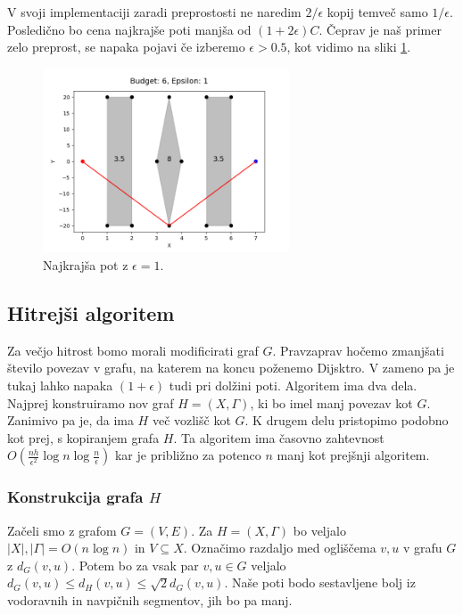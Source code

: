 \documentclass{article}
\begin{document}
V svoji implementaciji zaradi preprostosti ne naredim $2/\epsilon$ kopij temveč samo $1/\epsilon$. Posledično bo cena najkrajše poti manjša od $(1 + 2\epsilon)C$. Čeprav je naš primer zelo preprost, se napaka pojavi če izberemo $\epsilon > 0.5$, kot vidimo na sliki \ref{fig:errP05}.

\begin{figure}[ht]
    \centering
    \includegraphics[width=0.65\textwidth]{errPathEps1.png}
    \caption{Najkrajša pot z $\epsilon = 1$.}
    \label{fig:errP05}
\end{figure}




\subsection*{Hitrejši algoritem}

Za večjo hitrost bomo morali modificirati graf $G$. Pravzaprav hočemo zmanjšati število povezav v grafu, na katerem na koncu poženemo Dijsktro. V zameno pa je tukaj lahko napaka $(1+\epsilon)$ tudi pri dolžini poti. Algoritem ima dva dela. Najprej konstruiramo nov graf $H = (X,\Gamma)$, ki bo imel manj povezav kot $G$. Zanimivo pa je, da ima $H$ več vozlišč kot $G$. K drugem delu pristopimo podobno kot prej, s kopiranjem grafa $H$. Ta algoritem ima časovno zahtevnost $O(\frac{nh}{\epsilon^2}\log n \log \frac{n}{\epsilon})$ kar je približno za potenco $n$ manj kot prejšnji algoritem.

\subsubsection*{Konstrukcija grafa $H$}

Začeli smo z grafom $G = (V,E)$. Za $H = (X,\Gamma)$ bo veljalo $|X|, |\Gamma| = O(n \log n)$ in $V \subseteq X$. Označimo razdaljo med ogliščema $v,u$ v grafu $G$ z $d_G(v,u)$. Potem bo za vsak par $v,u \in G$ veljalo  $d_G(v,u) \leq d_H(v,u) \leq \sqrt{2}d_G(v,u)$. Naše poti bodo sestavljene bolj iz vodoravnih in navpičnih segmentov, jih bo pa manj.
\end{document}
